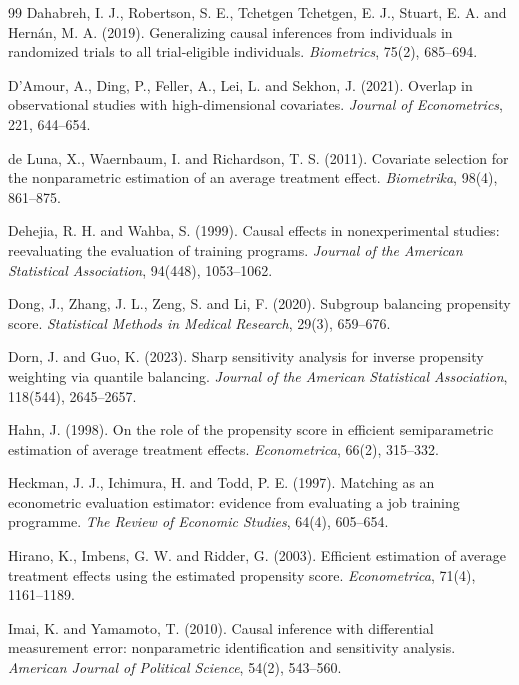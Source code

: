 \begin{thebibliography}{99}
 Dahabreh, I. J., Robertson, S. E., Tchetgen Tchetgen, E. J., Stuart, E. A. and Hernán, M. A. (2019). Generalizing causal inferences from individuals in randomized trials to all trial-eligible individuals. \emph{Biometrics}, 75(2), 685--694.

 D'Amour, A., Ding, P., Feller, A., Lei, L. and Sekhon, J. (2021). Overlap in observational studies with high-dimensional covariates. \emph{Journal of Econometrics}, 221, 644--654.

 de Luna, X., Waernbaum, I. and Richardson, T. S. (2011). Covariate selection for the nonparametric estimation of an average treatment effect. \emph{Biometrika}, 98(4), 861--875.

 Dehejia, R. H. and Wahba, S. (1999). Causal effects in nonexperimental studies: reevaluating the evaluation of training programs. \emph{Journal of the American Statistical Association}, 94(448), 1053--1062.

 Dong, J., Zhang, J. L., Zeng, S. and Li, F. (2020). Subgroup balancing propensity score. \emph{Statistical Methods in Medical Research}, 29(3), 659--676.

 Dorn, J. and Guo, K. (2023). Sharp sensitivity analysis for inverse propensity weighting via quantile balancing. \emph{Journal of the American Statistical Association}, 118(544), 2645--2657.

 Hahn, J. (1998). On the role of the propensity score in efficient semiparametric estimation of average treatment effects. \emph{Econometrica}, 66(2), 315--332.

 Heckman, J. J., Ichimura, H. and Todd, P. E. (1997). Matching as an econometric evaluation estimator: evidence from evaluating a job training programme. \emph{The Review of Economic Studies}, 64(4), 605--654.

 Hirano, K., Imbens, G. W. and Ridder, G. (2003). Efficient estimation of average treatment effects using the estimated propensity score. \emph{Econometrica}, 71(4), 1161--1189.

 Imai, K. and Yamamoto, T. (2010). Causal inference with differential measurement error: nonparametric identification and sensitivity analysis. \emph{American Journal of Political Science}, 54(2), 543--560.


\end{thebibliography}
